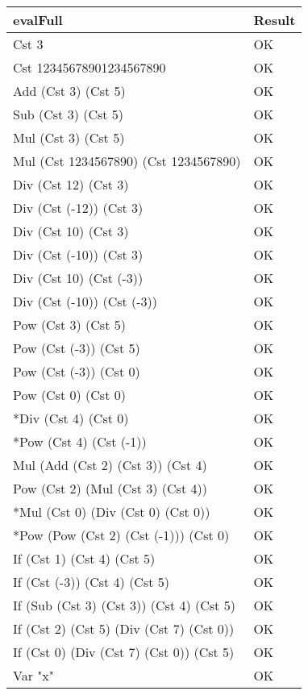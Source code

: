 \documentclass[12pt,a4paper]{article}
\begin{document}
\begin{tabularx}{\linewidth}[!htbp]{X|l}
 \textbf{evalFull} & Result \\
 \hline
	Cst 3 & OK \\
	\hline
    Cst 12345678901234567890 & OK \\
    \hline
    Add (Cst 3) (Cst 5) & OK \\
    \hline
    Sub (Cst 3) (Cst 5) & OK \\
    \hline
    Mul (Cst 3) (Cst 5) & OK \\
    \hline
    Mul (Cst 1234567890) (Cst 1234567890) & OK \\
    \hline
    Div (Cst 12) (Cst 3) & OK \\
    \hline
    Div (Cst (-12)) (Cst 3) & OK \\
    \hline
    Div (Cst 10) (Cst 3) & OK \\
    \hline
    Div (Cst (-10)) (Cst 3) & OK \\
    \hline
    Div (Cst 10) (Cst (-3)) & OK \\
    \hline
    Div (Cst (-10)) (Cst (-3)) & OK \\
    \hline
    Pow (Cst 3) (Cst 5) & OK \\
    \hline
    Pow (Cst (-3)) (Cst 5) & OK \\
    \hline
    Pow (Cst (-3)) (Cst 0) & OK \\
    \hline
    Pow (Cst 0) (Cst 0) & OK \\
    \hline
    *Div (Cst 4) (Cst 0) & OK \\
    \hline
    *Pow (Cst 4) (Cst (-1)) & OK \\
    \hline
    Mul (Add (Cst 2) (Cst 3)) (Cst 4) & OK \\
    \hline
    Pow (Cst 2) (Mul (Cst 3) (Cst 4)) & OK \\
    \hline
    *Mul (Cst 0) (Div (Cst 0) (Cst 0)) & OK \\
    \hline
    *Pow (Pow (Cst 2) (Cst (-1))) (Cst 0)& OK \\
    \hline
    If (Cst 1) (Cst 4) (Cst 5) & OK \\
    \hline
    If (Cst (-3)) (Cst 4) (Cst 5) & OK \\
    \hline
    If (Sub (Cst 3) (Cst 3)) (Cst 4) (Cst 5) & OK \\
    \hline
    If (Cst 2) (Cst 5) (Div (Cst 7) (Cst 0)) & OK \\
    \hline
    If (Cst 0) (Div (Cst 7) (Cst 0)) (Cst 5) & OK \\
    \hline
    Var "x" & OK \\

\end{tabularx}
\end{document}

